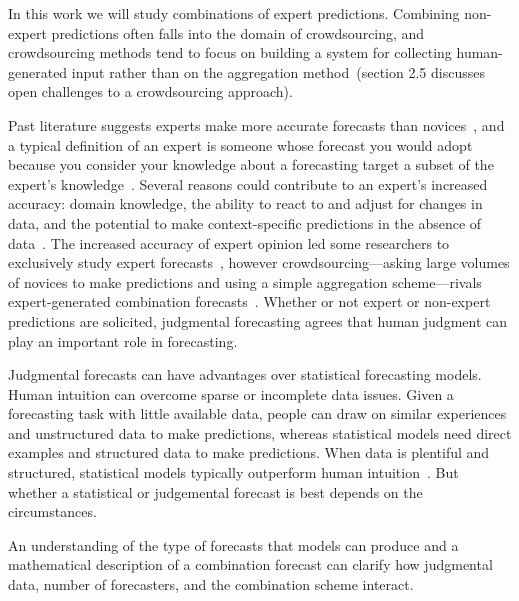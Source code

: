 \documentclass[preprint,authoryear,nonatbib]{elsarticle}
\begin{document}
In this work we will study combinations of expert predictions.
Combining non-expert predictions often falls into the domain of crowdsourcing, and crowdsourcing methods tend to focus on building a system for collecting human-generated input rather than on the aggregation method~(section 2.5 discusses open challenges to a crowdsourcing approach).

Past literature suggests experts make more accurate forecasts than novices~\parencite{armstrong2001combining,armstrong1983relative,lawrence2006judgmental,spence1997moderating,alexander1995refining,french2011aggregating,clemen1999combining}, and a typical definition of an expert is someone whose forecast you would adopt because you consider your knowledge about a forecasting target a subset of the expert's knowledge~\parencite{degroot1988bayesian}.
Several reasons could contribute to an expert's increased accuracy: domain knowledge, the ability to react to and adjust for changes in data, and the potential to make context-specific predictions in the absence of data~\parencite{armstrong1983relative,lawrence2006judgmental,spence1997moderating,alexander1995refining}.
The increased accuracy of expert opinion led some researchers to exclusively study expert forecasts~\parencite{armstrong2001combining,french2011aggregating,genre2013combining},
however crowdsourcing---asking large volumes of novices to make predictions and using a simple aggregation scheme---rivals expert-generated combination forecasts~\parencite{howe2006rise,lintott2008galaxy,prill2011crowdsourcing}.
Whether or not expert or non-expert predictions are solicited, judgmental forecasting agrees that human judgment can play an important role in forecasting.

Judgmental forecasts can have advantages over statistical forecasting models. 
Human intuition can overcome sparse or incomplete data issues.
Given a forecasting task with little available data, people can draw on similar experiences and unstructured data to make predictions, whereas statistical models need direct examples and structured data to make predictions.
When data is plentiful and structured, statistical models typically outperform human intuition~\parencite{meehl1954clinical,kleinmuntz1990we,yaniv1993judgmental}.
But whether a statistical or judgemental forecast is best depends on the circumstances. 

An understanding of the type of forecasts that models can produce and a mathematical description of a combination forecast can clarify how judgmental data, number of forecasters, and the combination scheme interact.
\end{document}
